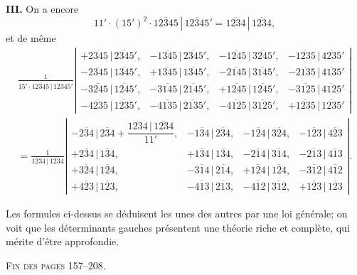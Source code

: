 \documentclass[11pt,a4paper]{article}
\theoremstyle{definition}
\begin{document}
\medskip

\textbf{III.} On a encore
\[
11' \cdot (15')^2 \cdot \overline{12345}\,|\,\overline{12345}'
= \overline{1234}\,|\,\overline{1234},
\]
et de m\^eme
\begin{multline*}
\frac{1}{15' \cdot \overline{12345}\,|\,\overline{12345}'}
\left|
\begin{array}{cccc}
+\overline{2345}\,|\,\overline{2345}', & -\overline{1345}\,|\,\overline{2345}', &
-\overline{1245}\,|\,\overline{3245}', & -\overline{1235}\,|\,\overline{4235}' \\
-\overline{2345}\,|\,\overline{1345}', & +\overline{1345}\,|\,\overline{1345}', &
-\overline{2145}\,|\,\overline{3145}', & -\overline{2135}\,|\,\overline{4135}' \\
-\overline{3245}\,|\,\overline{1245}', & -\overline{3145}\,|\,\overline{2145}', &
+\overline{1245}\,|\,\overline{1245}', & -\overline{3125}\,|\,\overline{4125}' \\
-\overline{4235}\,|\,\overline{1235}', & -\overline{4135}\,|\,\overline{2135}', &
-\overline{4125}\,|\,\overline{3125}', & +\overline{1235}\,|\,\overline{1235}'
\end{array}
\right| \\
=
\frac{1}{\overline{1234}\,|\,\overline{1234}}
\left|
\begin{array}{cccc}
-\overline{234}\,|\,\overline{234} + \dfrac{\overline{1234}\,|\,\overline{1234}}{11'}, &
-\overline{134}\,|\,\overline{234}, & -\overline{124}\,|\,\overline{324}, &
-\overline{123}\,|\,\overline{423} \\
+\overline{234}\,|\,\overline{134}, & +\overline{134}\,|\,\overline{134}, &
-\overline{214}\,|\,\overline{314}, & -\overline{213}\,|\,\overline{413} \\
+\overline{324}\,|\,\overline{124}, & -\overline{314}\,|\,\overline{214}, &
+\overline{124}\,|\,\overline{124}, & -\overline{312}\,|\,\overline{412} \\
+\overline{423}\,|\,\overline{123}, & -\overline{413}\,|\,\overline{213}, &
-\overline{412}\,|\,\overline{312}, & +\overline{123}\,|\,\overline{123}
\end{array}
\right|.
\end{multline*}

\medskip

Les formules ci-dessus se d\'eduisent les unes des autres par une loi
g\'en\'erale; on voit que les d\'eterminants gauches pr\'esentent une
th\'eorie riche et compl\`ete, qui m\'erite d'\^etre approfondie.

\medskip

\textsc{Fin des pages 157--208.}
\end{document}
